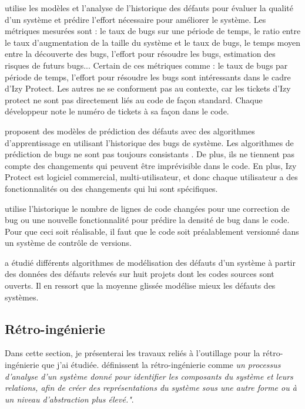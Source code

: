 \documentclass[a4paper]{article}
\begin{document}
\citet{port17} utilise les modèles et l'analyse de l'historique des défauts pour évaluer la qualité d'un système et prédire l'effort nécessaire pour améliorer le système. Les métriques mesurées sont : le taux de bugs sur une période de temps, le ratio entre le taux d'augmentation de la taille du système et le taux de bugs, le temps moyen entre la découverte des bugs, l'effort pour résoudre les bugs, estimation des risques de futurs bugs...
Certain de ces métriques comme : le taux de bugs par période de temps, l'effort pour résoudre les bugs sont intéressants dans le cadre d'Izy Protect. 
Les autres ne se conforment pas au contexte, car les tickets d'Izy protect ne sont pas directement liés au code de façon standard.
Chaque développeur note le numéro de tickets à sa façon dans le code. 


\citet{kim07,Bibi06} proposent des modèles de prédiction des défauts avec des algorithmes d'apprentissage en utilisant l'historique des bugs de système. 
Les algorithmes de prédiction de bugs ne sont pas toujours consistants \cite{bang19}. De plus, ils ne tiennent pas compte des changements qui peuvent être imprévisible dans le code. 
En plus, Izy Protect est logiciel commercial, multi-utilisateur, et donc chaque utilisateur a des fonctionnalités ou des changements qui lui sont spécifiques. 

\citet{naga05} utilise l'historique le nombre de lignes de code changées pour une correction de  bug  ou une nouvelle fonctionnalité pour prédire la densité de bug dans le code.
 Pour que ceci soit réalisable, il faut que le code soit préalablement versionné dans un système de contrôle de versions.

\citet{Raja09} a étudié différents algorithmes de modélisation des défauts d'un système à partir des données des défauts relevés sur huit projets dont les codes sources sont ouverts. Il en ressort que la moyenne glissée modélise mieux les défauts des systèmes.

\subsection{Rétro-ingénierie}
\label{sec:retroingenierie}
Dans cette section, je présenterai les travaux reliés à l'outillage pour la rétro-ingénierie que j'ai étudiée.
\citet{Chik90a} définissent la rétro-ingénierie comme \textit{un processus d'analyse d'un système donné pour identifier les composants du système et leurs relations, afin de créer des représentations du système sous une autre forme ou à un niveau d'abstraction plus élevé."}.
\end{document}
